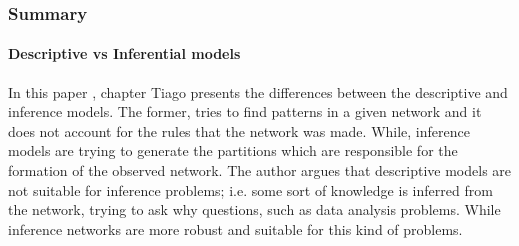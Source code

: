 \subsubsection{Summary}

\paragraph*{Descriptive vs Inferential models}

In this paper \citet{Peixoto2021-jx}, chapter Tiago presents the differences between the descriptive and inference models. The former, tries to find patterns in a given network and it does not account for the rules that the network was made. While,  inference models are trying to generate the partitions which are responsible for the formation of the observed network. The author argues that descriptive models are not suitable for inference problems; i.e. some sort of knowledge is inferred from the network, trying to ask why questions, such as data analysis problems. While inference networks are more robust and suitable for this kind of problems.
